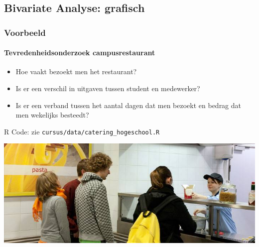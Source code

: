 \documentclass[aspectratio=169]{beamer}
\begin{document}
\subsection{Bivariate Analyse: grafisch}

\begin{frame}
  \frametitle{Voorbeeld}
  \framesubtitle{Tevredenheidsonderzoek campusrestaurant}


  \begin{itemize}
    \item Hoe vaakt bezoekt men het restaurant?
    \item Is er een verschil in uitgaven tussen student en medewerker?
    \item Is er een verband tussen het aantal dagen dat men bezoekt en bedrag dat men wekelijks besteedt?
  \end{itemize}

  R Code: zie \texttt{cursus/data/catering\_hogeschool.R}

  \centering
  \includegraphics[height=.4\textheight]{img/students.jpg}
\end{frame}
\end{document}
